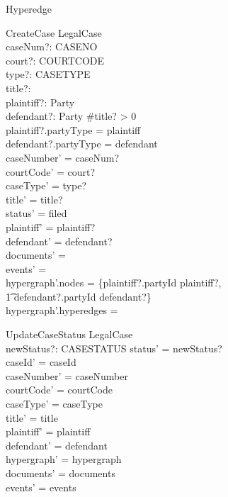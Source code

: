 \documentclass{article}
\begin{document}
\begin{class}{Hyperedge}
\begin{schema}{CreateCase}
    \Delta LegalCase \\
    caseNum?: CASENO \\
    court?: COURTCODE \\
    type?: CASETYPE \\
    title?: \seq \char \\
    plaintiff?: Party \\
    defendant?: Party
\where
    \#title? > 0 \\
    plaintiff?.partyType = plaintiff \\
    defendant?.partyType = defendant \\
    caseNumber' = caseNum? \\
    courtCode' = court? \\
    caseType' = type? \\
    title' = title? \\
    status' = filed \\
    plaintiff' = plaintiff? \\
    defendant' = defendant? \\
    documents' = \emptyset \\
    events' = \langle \rangle \\
    hypergraph'.nodes = \{plaintiff?.partyId \mapsto plaintiff?, \\
    \t1 defendant?.partyId \mapsto defendant?\} \\
    hypergraph'.hyperedges = \emptyset
\end{schema}

\begin{schema}{UpdateCaseStatus}
    \Delta LegalCase \\
    newStatus?: CASESTATUS
\where
    status' = newStatus? \\
    caseId' = caseId \\
    caseNumber' = caseNumber \\
    courtCode' = courtCode \\
    caseType' = caseType \\
    title' = title \\
    plaintiff' = plaintiff \\
    defendant' = defendant \\
    hypergraph' = hypergraph \\
    documents' = documents \\
    events' = events
\end{schema}


\end{class}
\end{document}
